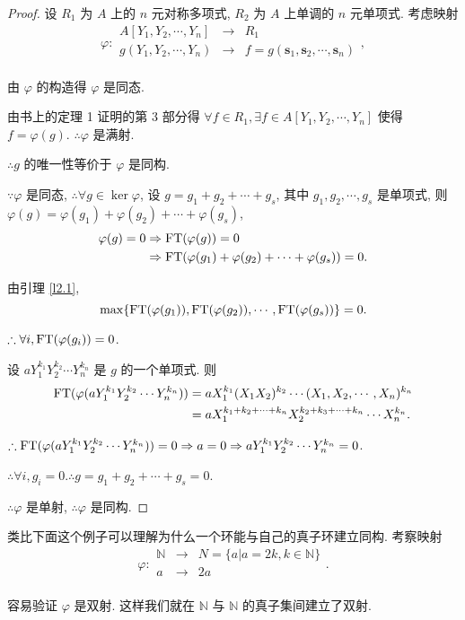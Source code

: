 \documentclass[color=black,device=normal,lang=cn,mode=geye]{elegantnote}
\begin{document}
\begin{proof}
    设 $R_1$ 为 $A$ 上的 $n$ 元对称多项式, $R_2$ 为 $A$ 上单调的 $n$ 元单项式. 考虑映射
    \[\varphi:\begin{array}{rcl}
        A[Y_1,Y_2,\cdots,Y_n] & \to & R_1 \\
        g(Y_1,Y_2,\cdots,Y_n) & \to & f=g(\mathbf{s}_1,\mathbf{s}_2,\cdots,\mathbf{s}_n) \\
    \end{array},\]

    由 $\varphi$ 的构造得 $\varphi$ 是同态.
    
    由书上的定理 1 证明的第 3 部分得 $\forall f\in R_1,\exists f\in A[Y_1,Y_2,\cdots,Y_n]$ 使得 $f=\varphi(g)$. $\therefore\varphi$ 是满射.
    
    $\therefore g$ 的唯一性等价于 $\varphi$ 是同构.
    
    $\because\varphi$ 是同态, $\therefore\forall g\in\ker\varphi$, 设 $g=g_1+g_2+\cdots+g_s$, 其中 $g_1,g_2,\cdots,g_s$ 是单项式, 则 $\varphi(g)=\varphi(g_1)+\varphi(g_2)+\cdots+\varphi(g_s)$,
    \begin{align*}
        \varphi(g)=0 & \Rightarrow\operatorname{FT} (\varphi(g))=0 \\
        & \Rightarrow\operatorname{FT} (\varphi(g_1)+\varphi(g_2)+\cdots+\varphi(g_s))=0.
    \end{align*}

    由引理 \ref{l2.1},
    \[\max\{\operatorname{FT} (\varphi(g_1)),\operatorname{FT} (\varphi(g_2)),\cdots,\operatorname{FT} (\varphi(g_s))\}=0.\]

    $\therefore\forall i,\operatorname{FT} (\varphi(g_i))=0$.

    设 $aY^{k_1}_1Y^{k_2}_2\cdots Y^{k_n}_n$ 是 $g$ 的一个单项式. 则
    \begin{align*}
        \operatorname{FT} (\varphi(aY^{k_1}_1Y^{k_2}_2\cdots Y^{k_n}_n)) & =aX_1^{k_1}(X_1X_2)^{k_2}\cdots(X_1,X_2,\cdots,X_n)^{k_n} \\
        & =aX_1^{k_1+k_2+\cdots+k_n}X_2^{k_2+k_3+\cdots+k_n}\cdots X_n^{k_n}.
    \end{align*}

    $\therefore\operatorname{FT} (\varphi(aY^{k_1}_1Y^{k_2}_2\cdots Y^{k_n}_n))=0\Rightarrow a=0\Rightarrow aY^{k_1}_1Y^{k_2}_2\cdots Y^{k_n}_n=0$.

    $\therefore\forall i,g_i=0.\therefore g=g_1+g_2+\cdots+g_s=0$.

    $\therefore\varphi$ 是单射, $\therefore\varphi$ 是同构.
\end{proof}
\begin{note}
    类比下面这个例子可以理解为什么一个环能与自己的真子环建立同构. 考察映射
    \[\varphi:\begin{array}{rcl}
        \mathbb{N} & \to & N=\{a|a=2k,k\in\mathbb{N}\} \\
        a & \to & 2a \\
    \end{array}.\]

    容易验证 $\varphi$ 是双射. 这样我们就在 $\mathbb{N}$ 与 $\mathbb{N}$ 的真子集间建立了双射.
\end{note}
\end{document}

